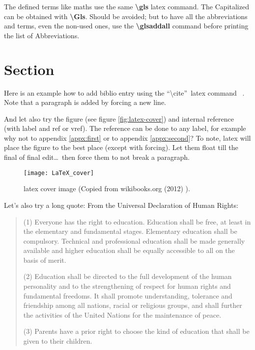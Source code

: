 The defined terms like \gls{maths} use the same \textbf{\textbackslash{}gls} \gls{latex} command. The Capitalized can be obtained with \textbf{\textbackslash{}Gls}. Should be avoided; but to have all the abbreviations and terms, even the non-used ones, use the \textbf{\textbackslash{}glsaddall} command before printing the list of Abbreviations. 

\section{Section}
Here is an example how to add biblio entry \cite{kopka:guide} using the \textquotedblleft\textbackslash{}cite\textquotedblright ~\gls{latex} command ~\cite[section 4.2]{tobias:book}. Note that a paragraph is added by forcing a new line.

And let also try the figure (see figure \vref{fig:latex-cover}) and internal reference (with label and ref or vref). The reference can be done to any label, for example why not to appendix \ref{appx:first} or to appendix \ref{appx:second}? To note, \gls{latex} will place the figure to the best place (except with forcing). Let them float till the final of final edit\ldots ~then force them to not break a paragraph.%
\begin{figure}[h]
  \centering
  \texttt{[image: LaTeX\_cover]}
  \caption{\gls{latex} cover image (Copied from wikibooks.org (2012) \cite{wikibooks:latex}).}
  \label{fig:latex-cover}
\end{figure}

Let's also try a long quote:
From the Universal Declaration of Human Rights:
\begin{quote}
(1) Everyone has the right to education. Education shall be free, at least in the elementary and fundamental stages. Elementary education shall be compulsory. Technical and professional education shall be made generally available and higher education shall be equally accessible to all on the basis of merit.

(2) Education shall be directed to the full development of the human personality and to the strengthening of respect for human rights and fundamental freedoms. It shall promote understanding, tolerance and friendship among all nations, racial or religious groups, and shall further the activities of the United Nations for the maintenance of peace.

(3) Parents have a prior right to choose the kind of education that shall be given to their children. \cite[article 26]{un:udhr}
\end{quote}

